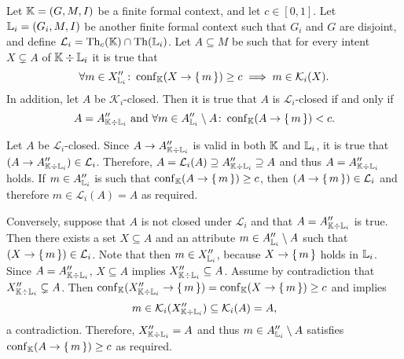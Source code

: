\begin{Proposition}
  \label{prop:easy-checking-confidence-closed}
  Let ${\mathbb{K}} = (G, M, I)$ be a finite formal context, and let $c \in [0,1]$.  Let ${\mathbb{L}}_{i} = (G_{i}, M, I)$ be another finite formal context such that $G_{i}$ and $G$ are
  disjoint, and define $\mathcal{L}_{i} = \operatorname{Th}_{c}({\mathbb{K}}) \cap \operatorname{Th}({\mathbb{L}}_{i})$.  Let $A
  \subseteq M$ be such that for every intent $X \subsetneq A$ of ${\mathbb{K}} \div {\ensuremath{\mathbb{L}}}_{i}$
  it is true that
  \begin{equation}
    \label{eq:44}
    \forall m \in X_{{\mathbb{L}}_{i}}'' \colon \operatorname{conf}_{{\mathbb{K}}}(X \to {\ensuremath{\{\,m\,\}}}) \ge c \implies m
    \in \mathcal{K}_{i}(X).
  \end{equation}
  In addition, let $A$ be $\mathcal{K}_{i}$-closed.  Then it is true that $A$ is
  $\mathcal{L}_{i}$-closed if and only if
  \begin{equation}
    \label{eq:45}
    A = A_{{\mathbb{K}} \div {\ensuremath{\mathbb{L}}}_{i}}'' \text{ and } \forall m \in A_{{\mathbb{L}}_{i}}'' \setminus
    A \colon \operatorname{conf}_{{\mathbb{K}}}(A \to {\ensuremath{\{\,m\,\}}}) < c.
  \end{equation}
\end{Proposition}
\begin{Proof}
  Let $A$ be $\mathcal{L}_{i}$-closed.  Since $A \to A_{{\mathbb{K}} \div {\ensuremath{\mathbb{L}}}_{i}}''$ is
  valid in both ${\mathbb{K}}$ and ${\mathbb{L}}_{i}$, it is true that $(A \to A_{{\mathbb{K}} \div {\ensuremath{\mathbb{L}}}_{i}}'') \in \mathcal{L}_{i}$.  Therefore, $A = \mathcal{L}_{i}(A) \supseteq A_{{\mathbb{K}} \div {\ensuremath{\mathbb{L}}}_{i}}'' \supseteq A$ and thus $A = A_{{\mathbb{K}} \div {\ensuremath{\mathbb{L}}}_{i}}''$ holds.
  If $m \in A_{{\mathbb{L}}_{i}}''$ is such that $\operatorname{conf}_{{\mathbb{K}}}(A \to {\ensuremath{\{\,m\,\}}}) \ge c$, then $(A
  \to {\ensuremath{\{\,m\,\}}}) \in \mathcal{L}_{i}$ and therefore $m \in \mathcal{L}_{i}(A) = A$ as
  required.

  Conversely, suppose that $A$ is not closed under $\mathcal{L}_{i}$ and that $A = A_{{\mathbb{K}} \div {\ensuremath{\mathbb{L}}}_{i}}''$ is true.  Then there exists a set $X \subseteq A$ and an
  attribute $m \in A_{{\mathbb{L}}_{i}}'' \setminus A$ such that $(X \to {\ensuremath{\{\,m\,\}}}) \in
  \mathcal{L}_{i}$.  Note that then $m \in X_{{\mathbb{L}}_{i}}''$, because $X \to {\ensuremath{\{\,m\,\}}}$
  holds in ${\mathbb{L}}_{i}$.  Since $A = A_{{\mathbb{K}} \div {\ensuremath{\mathbb{L}}}_{i}}''$, $X \subseteq A$
  implies $X_{{\mathbb{K}} \div {\ensuremath{\mathbb{L}}}_{i}}'' \subseteq A$.  Assume by contradiction that
  $X_{{\mathbb{K}} \div {\ensuremath{\mathbb{L}}}_{i}}'' \subsetneq A$.  Then $\operatorname{conf}_{{\mathbb{K}}}(X_{{\mathbb{K}} \div {\ensuremath{\mathbb{L}}}_{i}}'' \to {\ensuremath{\{\,m\,\}}}) = \operatorname{conf}_{{\mathbb{K}}}(X \to {\ensuremath{\{\,m\,\}}}) \ge c$ and  implies
  \begin{equation*}
    m \in \mathcal{K}_{i}(X_{{\mathbb{K}} \div {\ensuremath{\mathbb{L}}}_{i}}'') \subseteq \mathcal{K}_{i}(A) = A,
  \end{equation*}
  a contradiction.  Therefore, $X_{{\mathbb{K}} \div {\ensuremath{\mathbb{L}}}_{i}}'' = A$ and thus $m \in A_{{\mathbb{L}}_{i}}'' \setminus A$ satisfies $\operatorname{conf}_{{\mathbb{K}}}(A \to {\ensuremath{\{\,m\,\}}}) \ge c$ as required.
\end{Proof}

